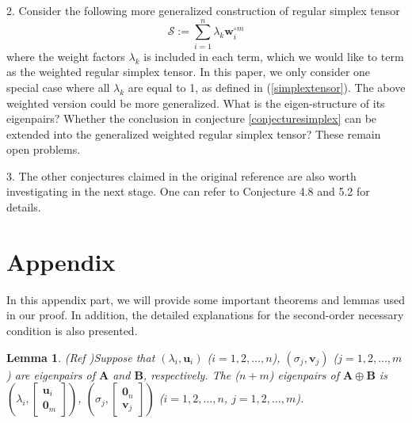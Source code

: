 \documentclass{elsarticle}
\newtheorem{lemma}{\textbf{Lemma } }
\begin{document}
2. Consider  the  following  more  generalized   construction of   regular simplex tensor
	\begin{equation}%
\mathcal{S}:=\sum_{i=1}^{n} 
\lambda_{k} \mathbf{w}_{i}^{\circ m}
\end{equation}
where the  weight  factors $\lambda_{k}$  is   included  in  each  term,  which we 
would like to term as the weighted regular simplex tensor.
In this  paper,  
we only consider  one  special case where all  $\lambda_{k} $  are  equal to 1, as defined in 
(\ref{simplextensor}).
The  above weighted version could be  more generalized.
What is the eigen-structure of  its  eigenpairs?
Whether the   conclusion  in conjecture  \ref{conjecturesimplex}  
can be  extended into the generalized  weighted regular simplex tensor?
These  remain    open problems.

3. The other conjectures  claimed in the original reference \cite{RobustEigen}
are also worth investigating  in the next  stage. 
One can refer to Conjecture 4.8 and 5.2 for details. 


\section{Appendix}

In this  appendix part,   
we will provide some important theorems   and lemmas 
 used in our proof.
 In addition,  
the detailed  explanations for the second-order necessary  condition is also presented.

\begin{lemma}(Ref \cite{zhang2017matrix})\label{direct_eig}
	Suppose  that 
	$ (\lambda_{i},  \mathbf u_{i})$  
	($i=1,2,\dots,n$),
	$  (\sigma_{j},  \mathbf v_{j})$  
	($j=1,2,\dots,m$)  
	are  eigenpairs of  
	$ \mathbf A$ and $ \mathbf B$, respectively. 
	The ($n+m$)  eigenpairs   of  
	$ \mathbf  {A} \oplus \mathbf  {B}$  
	is  
	$ (\lambda_{i},  
	\begin{bmatrix}
	\mathbf u_{i}   \\
	\mathbf 0_{m}    
	\end{bmatrix}	)$, 
	$ (\sigma_{j},  
	\begin{bmatrix}
	\mathbf 0_{n}   \\
	\mathbf v_{j}
	\end{bmatrix}	)$ 	($i=1,2,\dots,n$, $j=1,2,\dots,m$).
\end{lemma}
\end{document}

